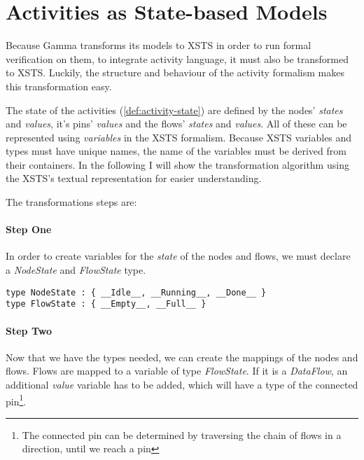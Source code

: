 \section{Activities as State-based Models}\label{sec:activities-as-state-based-models}

Because Gamma transforms its models to XSTS in order to run formal verification on them, to integrate activity language, it must also be transformed to XSTS. Luckily, the structure and behaviour of the activity formalism makes this transformation easy.

The state of the activities (\autoref{def:activity-state}) are defined by the nodes' \emph{states} and \emph{values}, it's pins' \emph{values} and the flows' \emph{states} and \emph{values}. All of these can be represented using \emph{variables} in the XSTS formalism. Because XSTS variables and types must have unique names, the name of the variables must be derived from their containers. In the following I will show the transformation algorithm using the XSTS's textual representation for easier understanding.

The transformations steps are:

\paragraph{Step One} 

In order to create variables for the \emph{state} of the nodes and flows, we must declare a \emph{NodeState} and \emph{FlowState} type.

\begin{lstlisting}[language=xsts]
type NodeState : { __Idle__, __Running__, __Done__ }
type FlowState : { __Empty__, __Full__ }
\end{lstlisting}

\paragraph{Step Two} 

Now that we have the types needed, we can create the mappings of the nodes and flows. Flows are mapped to a variable of type \emph{FlowState}. If it is a \emph{DataFlow}, an additional \emph{value} variable has to be added, which will have a type of the connected pin\footnote{The connected pin can be determined by traversing the chain of flows in a direction, until we reach a pin}.

